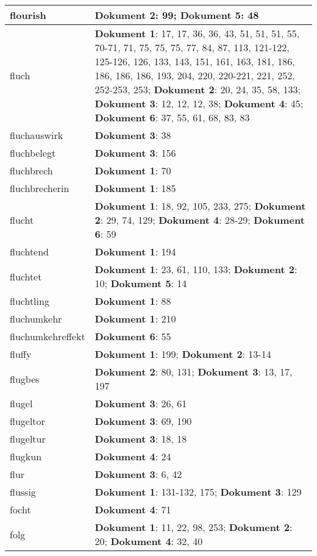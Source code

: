 \documentclass[a5paper]{article}
\begin{document}
\begin{longtable}[l]{|l|p{3in}|}
\hline
flourish & \textbf{Dokument 2}: 99; \textbf{Dokument 5}: 48 \\
\hline
fluch & \textbf{Dokument 1}: 17, 17, 36, 36, 43, 51, 51, 51, 55, 70-71, 71, 75, 75, 75, 77, 84, 87, 113, 121-122, 125-126, 126, 133, 143, 151, 161, 163, 181, 186, 186, 186, 186, 193, 204, 220, 220-221, 221, 252, 252-253, 253; \textbf{Dokument 2}: 20, 24, 35, 58, 133; \textbf{Dokument 3}: 12, 12, 12, 38; \textbf{Dokument 4}: 45; \textbf{Dokument 6}: 37, 55, 61, 68, 83, 83 \\
\hline
fluchauswirk & \textbf{Dokument 3}: 38 \\
\hline
fluchbelegt & \textbf{Dokument 3}: 156 \\
\hline
fluchbrech & \textbf{Dokument 1}: 70 \\
\hline
fluchbrecherin & \textbf{Dokument 1}: 185 \\
\hline
flucht & \textbf{Dokument 1}: 18, 92, 105, 233, 275; \textbf{Dokument 2}: 29, 74, 129; \textbf{Dokument 4}: 28-29; \textbf{Dokument 6}: 59 \\
\hline
fluchtend & \textbf{Dokument 1}: 194 \\
\hline
fluchtet & \textbf{Dokument 1}: 23, 61, 110, 133; \textbf{Dokument 2}: 10; \textbf{Dokument 5}: 14 \\
\hline
fluchtling & \textbf{Dokument 1}: 88 \\
\hline
fluchumkehr & \textbf{Dokument 1}: 210 \\
\hline
fluchumkehreffekt & \textbf{Dokument 6}: 55 \\
\hline
fluffy & \textbf{Dokument 1}: 199; \textbf{Dokument 2}: 13-14 \\
\hline
flugbes & \textbf{Dokument 2}: 80, 131; \textbf{Dokument 3}: 13, 17, 197 \\
\hline
flugel & \textbf{Dokument 3}: 26, 61 \\
\hline
flugeltor & \textbf{Dokument 3}: 69, 190 \\
\hline
flugeltur & \textbf{Dokument 3}: 18, 18 \\
\hline
flugkun & \textbf{Dokument 4}: 24 \\
\hline
flur & \textbf{Dokument 3}: 6, 42 \\
\hline
flussig & \textbf{Dokument 1}: 131-132, 175; \textbf{Dokument 3}: 129 \\
\hline
focht & \textbf{Dokument 4}: 71 \\
\hline
folg & \textbf{Dokument 1}: 11, 22, 98, 253; \textbf{Dokument 2}: 20; \textbf{Dokument 4}: 32, 40 \\

\end{longtable}
\end{document}
